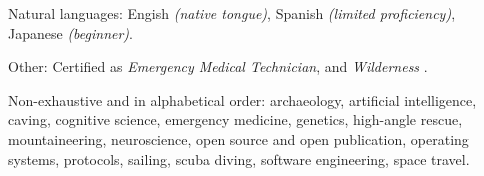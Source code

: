 \documentclass[10pt,a4paper]{article}
\begin{document}
\vspace{0.5em}
\inlineheadsection
  {Natural languages:}
  {Engish \emph{(native tongue)}, Spanish \emph{(limited proficiency)}, Japanese \emph{(beginner)}.}

\vspace{0.5em}
\inlineheadsection
  {Other:}
  {Certified as \emph{Emergency Medical Technician}, and \emph{Wilderness }.}

\spacedhrule{1.6em}{-0.4em}


\inlineheadsection
  {Non-exhaustive and in alphabetical order:}
  {archaeology, artificial intelligence, caving, cognitive science, emergency medicine, genetics, high-angle rescue, mountaineering, neuroscience, open source and open publication, operating systems, protocols, sailing, scuba diving, software engineering, space travel.}
\end{document}
